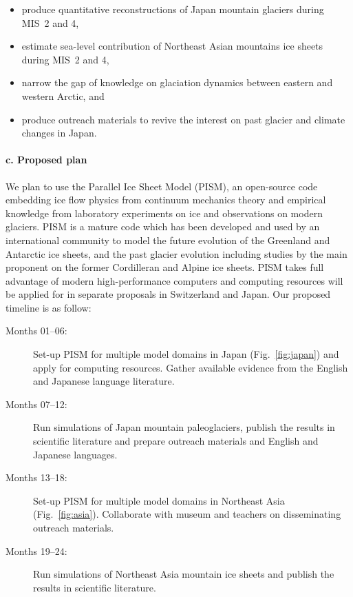 \documentclass{article}
\begin{document}
    \begin{itemize}
      \item{produce quantitative reconstructions of Japan mountain glaciers
            during MIS~2 and 4,}
      \item{estimate sea-level contribution of Northeast Asian mountains ice
            sheets during MIS~2 and 4,}
      \item{narrow the gap of knowledge on glaciation dynamics between
            eastern and western Arctic, and}
      \item{produce outreach materials to revive the interest on past glacier
            and climate changes in Japan.}
    \end{itemize}


\paragraph{c. Proposed plan}

    We plan to use the Parallel Ice Sheet Model (PISM), an open-source code
    embedding ice flow physics from continuum mechanics theory and empirical
    knowledge from laboratory experiments on ice and observations on modern
    glaciers. PISM is a mature code which has been developed and used by an
    international community to model the future evolution of the Greenland and
    Antarctic ice sheets, and the past glacier evolution including studies by
    the main proponent on the former Cordilleran and Alpine ice sheets. PISM
    takes full advantage of modern high-performance computers and computing
    resources will be applied for in separate proposals in Switzerland and
    Japan. Our proposed timeline is as follow:
    \begin{description}
      \item[Months 01--06:]
        Set-up PISM for multiple model domains in Japan (Fig.~\ref{fig:japan})
        and apply for computing resources. Gather available evidence from the
        English and Japanese language literature.
      \item[Months 07--12:]
        Run simulations of Japan mountain paleoglaciers, publish the results in
        scientific literature and prepare outreach materials and English and
        Japanese languages.
      \item[Months 13--18:]
        Set-up PISM for multiple model domains in Northeast Asia
        (Fig.~\ref{fig:asia}). Collaborate with museum and teachers on
        disseminating outreach materials.
      \item[Months 19--24:]
        Run simulations of Northeast Asia mountain ice sheets and publish the
        results in scientific literature.
    \end{description}
\end{document}
